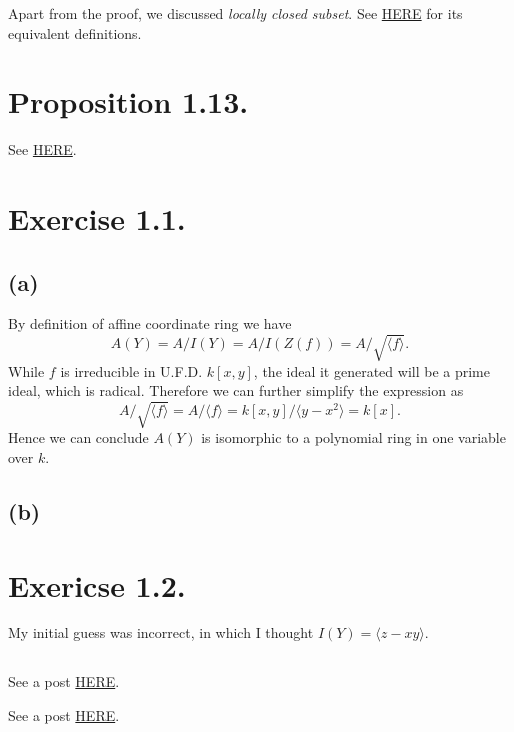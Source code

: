 Apart from the proof, we discussed \textit{locally closed subset}.
See \href{https://en.wikipedia.org/wiki/Locally_closed_subset}{HERE} for its equivalent definitions.

\section{Proposition 1.13.}

See \href{https://math.stackexchange.com/questions/1292811/help-with-proposition-1-13-in-hartshornes-algebraic-geometry}{HERE}.

\section{Exercise 1.1.}

\subsection{(a)}

By definition of affine coordinate ring we have 
\[A(Y)=A/I(Y)=A/I(Z(f))=A/\sqrt{\langle f\rangle}.\]
While $f$ is irreducible in U.F.D. $k[x,y]$, the ideal it generated will be a prime ideal, which is radical. Therefore we can further simplify the expression as 
\[A/\sqrt{\langle f\rangle}=A/\langle f\rangle=k[x,y]/\langle y-x^2\rangle=k[x].\]
Hence we can conclude $A(Y)$ is isomorphic to a polynomial ring in one variable over $k$.

\subsection{(b)}

\section{Exericse 1.2.}

My initial guess was incorrect, in which I thought $I(Y)=\langle z-xy\rangle$.

\subsection{}

See a post \href{https://math.stackexchange.com/questions/3137828/proving-y-x2-z-xy-generate-the-ideal-of-the-twisted-cubic}{HERE}.


See a post \href{https://math.stackexchange.com/questions/1864637/the-affine-coordinate-ring-of-twisted-cubic-curve-y-is-ay-kx-y-z-z-x3}{HERE}.

